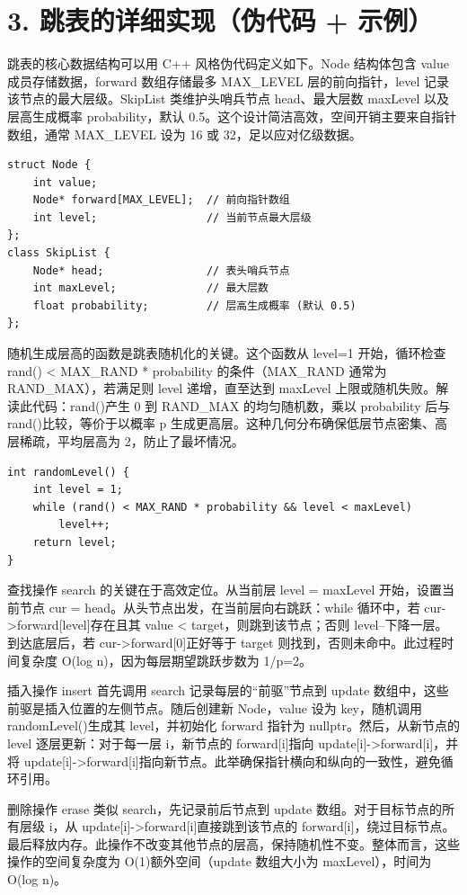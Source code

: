 \chapter{3. 跳表的详细实现（伪代码 + 示例）}
跳表的核心数据结构可以用 C++ 风格伪代码定义如下。Node 结构体包含 value 成员存储数据，forward 数组存储最多 MAX\_{}LEVEL 层的前向指针，level 记录该节点的最大层级。SkipList 类维护头哨兵节点 head、最大层数 maxLevel 以及层高生成概率 probability，默认 0.5。这个设计简洁高效，空间开销主要来自指针数组，通常 MAX\_{}LEVEL 设为 16 或 32，足以应对亿级数据。\par
\begin{lstlisting}
struct Node {
    int value;
    Node* forward[MAX_LEVEL];  // 前向指针数组
    int level;                 // 当前节点最大层级
};
class SkipList {
    Node* head;                // 表头哨兵节点
    int maxLevel;              // 最大层数
    float probability;         // 层高生成概率 (默认 0.5)
};
\end{lstlisting}
随机生成层高的函数是跳表随机化的关键。这个函数从 level=1 开始，循环检查 rand() < MAX\_{}RAND * probability 的条件（MAX\_{}RAND 通常为 RAND\_{}MAX），若满足则 level 递增，直至达到 maxLevel 上限或随机失败。解读此代码：rand()产生 0 到 RAND\_{}MAX 的均匀随机数，乘以 probability 后与 rand()比较，等价于以概率 p 生成更高层。这种几何分布确保低层节点密集、高层稀疏，平均层高为 2，防止了最坏情况。\par
\begin{lstlisting}
int randomLevel() {
    int level = 1;
    while (rand() < MAX_RAND * probability && level < maxLevel)
        level++;
    return level;
}
\end{lstlisting}
查找操作 search 的关键在于高效定位。从当前层 level = maxLevel 开始，设置当前节点 cur = head。从头节点出发，在当前层向右跳跃：while 循环中，若 cur->forward[level]存在且其 value < target，则跳到该节点；否则 level--下降一层。到达底层后，若 cur->forward[0]正好等于 target 则找到，否则未命中。此过程时间复杂度 O(log n)，因为每层期望跳跃步数为 1/p=2。\par
插入操作 insert 首先调用 search 记录每层的“前驱”节点到 update 数组中，这些前驱是插入位置的左侧节点。随后创建新 Node，value 设为 key，随机调用 randomLevel()生成其 level，并初始化 forward 指针为 nullptr。然后，从新节点的 level 逐层更新：对于每一层 i，新节点的 forward[i]指向 update[i]->forward[i]，并将 update[i]->forward[i]指向新节点。此举确保指针横向和纵向的一致性，避免循环引用。\par
删除操作 erase 类似 search，先记录前后节点到 update 数组。对于目标节点的所有层级 i，从 update[i]->forward[i]直接跳到该节点的 forward[i]，绕过目标节点。最后释放内存。此操作不改变其他节点的层高，保持随机性不变。整体而言，这些操作的空间复杂度为 O(1)额外空间（update 数组大小为 maxLevel），时间为 O(log n)。\par
